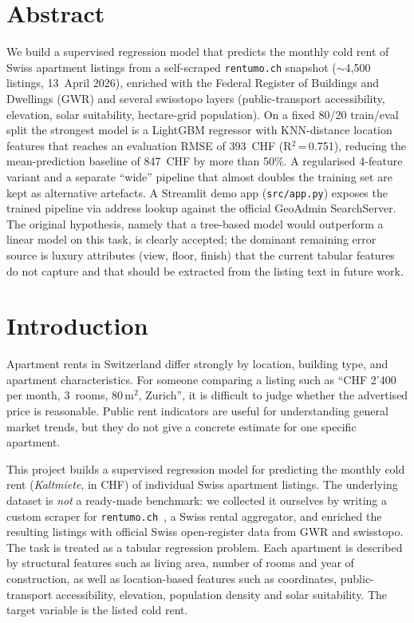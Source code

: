 \documentclass[11pt,a4paper]{article}
\begin{document}
\tableofcontents
\newpage

\section*{Abstract}
We build a supervised regression model that predicts the monthly cold rent of Swiss apartment listings from a self-scraped \texttt{rentumo.ch} snapshot ($\sim$4{,}500 listings, 13~April 2026), enriched with the Federal Register of Buildings and Dwellings (GWR) and several swisstopo layers (public-transport accessibility, elevation, solar suitability, hectare-grid population). On a fixed 80/20 train/eval split the strongest model is a LightGBM regressor with KNN-distance location features that reaches an evaluation RMSE of 393~CHF (R$^2$\,=\,0.751), reducing the mean-prediction baseline of 847~CHF by more than 50\%. A regularised 4-feature variant and a separate ``wide'' pipeline that almost doubles the training set are kept as alternative artefacts. A Streamlit demo app (\texttt{src/app.py}) exposes the trained pipeline via address lookup against the official GeoAdmin SearchServer. The original hypothesis, namely that a tree-based model would outperform a linear model on this task, is clearly accepted; the dominant remaining error source is luxury attributes (view, floor, finish) that the current tabular features do not capture and that should be extracted from the listing text in future work.

\newpage

\section{Introduction}
\label{sec:introduction}

Apartment rents in Switzerland differ strongly by location, building type, and apartment characteristics. For someone comparing a listing such as ``CHF 2'400 per month, 3~rooms, 80\,m$^2$, Zurich'', it is difficult to judge whether the advertised price is reasonable. Public rent indicators are useful for understanding general market trends, but they do not give a concrete estimate for one specific apartment.

This project builds a supervised regression model for predicting the monthly cold rent (\emph{Kaltmiete}, in CHF) of individual Swiss apartment listings. The underlying dataset is \emph{not} a ready-made benchmark: we collected it ourselves by writing a custom scraper for \texttt{rentumo.ch}~\citep{rentumo}, a Swiss rental aggregator, and enriched the resulting listings with official Swiss open-register data from GWR and swisstopo. The task is treated as a tabular regression problem. Each apartment is described by structural features such as living area, number of rooms and year of construction, as well as location-based features such as coordinates, public-transport accessibility, elevation, population density and solar suitability. The target variable is the listed cold rent.
\end{document}
